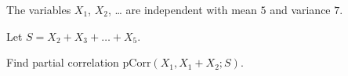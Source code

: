 
\begin{question}
The variables \(X_1\), \(X_2\), \ldots{} are independent with mean \(5\) and variance \(7\).

Let \(S = X_{2} + X_{3} + \ldots + X_{5}\).

Find partial correlation \(\mathrm{pCorr}(X_1, X_1 + X_2; S)\).
\end{question}


